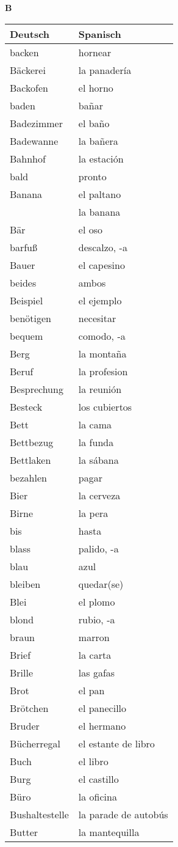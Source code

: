 \begin{flushright}\begin{Huge}\textbf{B}\end{Huge}\end{flushright}

\begin{longtable}{p{} p{}} 
\textbf{Deutsch}     & \textbf{Spanisch}                                       \\ \hline
\hline
\endhead %
backen & hornear\\
Bäckerei & la panadería\\
Backofen & el horno\\
baden & bañar\\
Badezimmer & el baño\\
Badewanne & la bañera\\
Bahnhof & la estación \\
bald & pronto\\
Banana & el paltano\\
~ & la banana\\
Bär & el oso\\
barfuß & descalzo, -a\\
Bauer & el capesino \\
beides & ambos\\
Beispiel & el ejemplo \\
benötigen & necesitar\\
bequem & comodo, -a\\
Berg & la montaña \\
Beruf & la profesion\\
Besprechung & la reunión\\
Besteck & los cubiertos\\
Bett & la cama \\
Bettbezug & la funda\\
Bettlaken & la sábana\\
bezahlen & pagar\\
Bier & la cerveza\\
Birne & la pera\\
bis & hasta \\
blass & palido, -a\\
blau & azul \\
bleiben & quedar(se)\\
Blei & el plomo \\
blond & rubio, -a\\
braun & marron \\
Brief & la carta\\
Brille & las gafas\\
Brot & el pan\\
Brötchen & el panecillo\\
Bruder & el hermano\\
Bücherregal & el estante de libro\\
Buch & el libro \\
Burg & el castillo\\
Büro & la oficina\\
Bushaltestelle & la parade de autobús\\
Butter & la mantequilla \\
\end{longtable}
